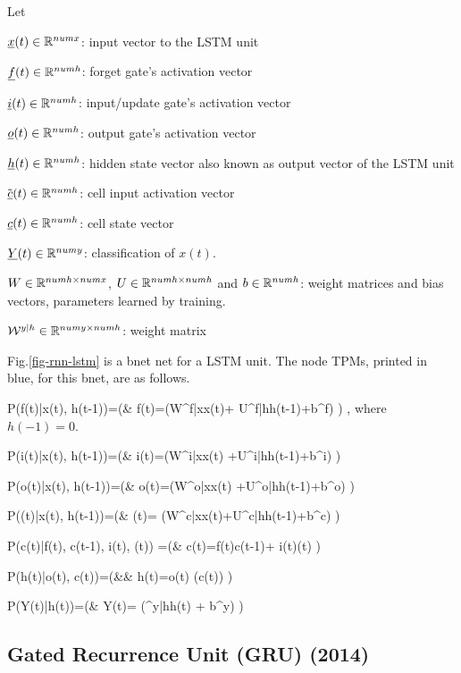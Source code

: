 Let

${\underline{x}}(t)\in { \mathbb{R}}^{numx}$: 
input vector to the LSTM unit

${\underline{f}}(t)\in { \mathbb{R}}^{numh}$:
forget gate's activation vector

${\underline{i}}(t)\in { \mathbb{R}}^{numh}$: 
input/update gate's activation vector

${\underline{o}}(t)\in { \mathbb{R}}^{numh}$: 
output gate's activation vector

${\underline{h}}(t)\in { \mathbb{R}}^{numh}$: 
hidden state vector also known as
 output vector of the LSTM unit

${\tilde {{\underline{c}}}}(t)\in { \mathbb{R}}^{numh}$: 
cell input activation vector

${\underline{c}}(t)\in { \mathbb{R}}^{numh}$: 
cell state vector

${\underline{Y}}(t)\in { \mathbb{R}}^{numy}$: 
classification of $x(t)$.

$W\in { \mathbb{R}}^{numh\times numx}$, 
$U\in { \mathbb{R}}^{numh\times numh}$
and 
$b\in { \mathbb{R}}^{numh}$: 
weight matrices and bias vectors,
 parameters learned by training.

${\cal W}^{y|h}\in { \mathbb{R}}^{numy\times numh}$:
 weight matrix


Fig.\ref{fig-rnn-lstm}
is a bnet net
for a LSTM unit.
The node TPMs, printed in blue,
for this bnet, are
as follows.

\beqa\color{blue}
P(f(t)|x(t), h(t-1))=\indi(\;\;\;&
f(t)=\sig(W^{f|x}x(t)+
U^{f|h}h(t-1)+b^{f})
\;\;\;)
\;,
\eeqa
where $h(-1)=0$.

\beqa\color{blue}
P(i(t)|x(t), h(t-1))=\indi(\;\;\;&
i(t)=\sig(W^{i|x}x(t)
+U^{i|h}h(t-1)+b^{i})
\;\;\;)
\eeqa

\beqa\color{blue}
P(o(t)|x(t), h(t-1))=\indi(\;\;\;&
o(t)=\sig(W^{o|x}x(t)
+U^{o|h}h(t-1)+b^{o})
\;\;\;)
\eeqa

\beqa\color{blue}
P((t)|x(t), h(t-1))=\indi(\;\;\;&
(t)=\tanh
(W^{c|x}x(t)+U^{c|h}h(t-1)+b^{c})
\;\;\;)
\eeqa

\beqa\color{blue}
P(c(t)|f(t), c(t-1), i(t),
 (t))
=\indi(\;\;\;&
c(t)=f(t)\odot c(t-1)+
i(t)(t)
\;\;\;)
\eeqa

\beqa\color{blue}
P(h(t)|o(t), c(t))=\indi(\;\;\;&&
h(t)=o(t)\odot \tanh
(c(t))
\;\;\;)
\eeqa



\beqa\color{blue}
P(Y(t)|h(t))=\indi(\;\;\;&
Y(t)= \cala(\calw^{y|h}h(t) + b^y)
\;\;\;)
\eeqa

\newpage
\subsection{Gated Recurrence Unit
 (GRU) (2014)}

